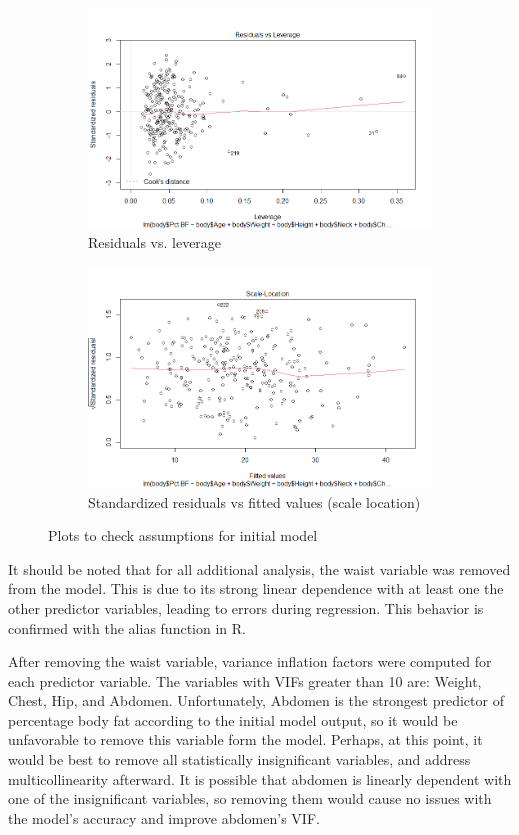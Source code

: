 \documentclass[12pt]{article}
\begin{document}
\begin{figure}
\begin{subfigure}{.45\textwidth}
  \centering
  \includegraphics[width=.8\linewidth]{residvlev1.png}  
  \caption{Residuals vs. leverage}
  \label{fig:sub-third}
\end{subfigure}
\begin{subfigure}{.45\textwidth}
  \centering
  \includegraphics[width=.8\linewidth]{scaleloc1.png}  
  \caption{Standardized residuals vs fitted values (scale location)}
  \label{fig:sub-fourth}
\end{subfigure}
\caption{Plots to check assumptions for initial model}
\label{fig:fig}
\end{figure}

It should be noted that for all additional analysis, the waist variable was removed from the model. This is due to its strong linear dependence with at least one the other predictor variables, leading to errors during regression. This behavior is confirmed with the alias function in R.

After removing the waist variable, variance inflation factors were computed for each predictor variable. The variables with VIFs greater than 10 are: Weight, Chest, Hip, and Abdomen. Unfortunately, Abdomen is the strongest predictor of percentage body fat according to the initial model output, so it would be unfavorable to remove this variable form the model. Perhaps, at this point, it would be best to remove all statistically insignificant variables, and address multicollinearity afterward. It is possible that abdomen is linearly dependent with one of the insignificant variables, so removing them would cause no issues with the model's accuracy and improve abdomen's VIF.  
\end{document}
